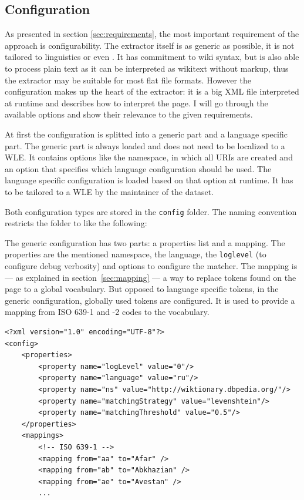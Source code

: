 \subsection{Configuration}
As presented in section \ref{sec:requirements}, the most important requirement of the approach is configurability. The extractor itself is as generic as possible, it is not tailored to linguistics or even \wik. 
It has commitment to wiki syntax, but is also able to process plain text as it can be interpreted as wikitext without markup, thus the extractor may be suitable for most flat file formats. 
However the configuration makes up the heart of the extractor: it is a big XML file interpreted at runtime and describes how to interpret the page. 
I will go through the available options and show their relevance to the given requirements.

At first the configuration is splitted into a generic part and a language specific part. 
The generic part is always loaded and does not need to be localized to a WLE. 
It contains options like the namespace, in which all URIs are created and an option that specifies which language configuration should be used. 
The language specific configuration is loaded based on that option at runtime. 
It has to be tailored to a WLE by the maintainer of the dataset.

Both configuration types are stored in the \texttt{config} folder. 
The naming convention restricts the folder to like the following:

The generic configuration has two parts: a properties list and a mapping. 
The properties are the mentioned namespace, the language, the \texttt{loglevel} (to configure debug verbosity) and options to configure the matcher. 
The mapping is --- as explained in section~\ref{sec:mapping} --- a way to replace tokens found on the page to a global vocabulary. 
But opposed to language specific tokens, in the generic configuration, globally used tokens are configured. 
It is used to provide a mapping from ISO 639-1 and -2 codes to the \wik vocabulary.

\begin{lstlisting}[style=XML]
<?xml version="1.0" encoding="UTF-8"?>
<config>
    <properties>
        <property name="logLevel" value="0"/>
        <property name="language" value="ru"/>
        <property name="ns" value="http://wiktionary.dbpedia.org/"/>
        <property name="matchingStrategy" value="levenshtein"/>
        <property name="matchingThreshold" value="0.5"/>
    </properties>
    <mappings>
        <!-- ISO 639-1 -->
        <mapping from="aa" to="Afar" />
        <mapping from="ab" to="Abkhazian" />
        <mapping from="ae" to="Avestan" />
        ...
\end{lstlisting}

